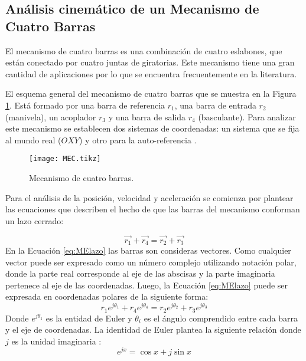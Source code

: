 \subsection{Análisis cinemático de un Mecanismo de Cuatro Barras}\label{sec:Análisis cinemático de un Mecanismo de Cuatro Barras}
El mecanismo de cuatro barras es una combinación de cuatro eslabones, que están conectado por cuatro juntas de giratorias. Este mecanismo tiene una gran cantidad de aplicaciones por lo que se encuentra frecuentemente en la literatura. 


El esquema general del mecanismo de cuatro barras que se muestra en la Figura \ref{fig:MEC}. Está formado por una barra de referencia $r_1$, una barra de entrada $r_2$ (manivela), un acoplador $r_3$ y una barra de salida $r_4$ (basculante). Para analizar este mecanismo se establecen dos sistemas de coordenadas: un sistema que se fija al mundo real ($OXY$) y otro para la auto-referencia \cite{herne1_two_swim_2016}.

\begin{figure}[htb]
    \centering
    \resizebox {\textwidth} {\height} {
     \texttt{[image: MEC.tikz]}
     }
    \caption{Mecanismo de cuatro barras.}
    \label{fig:MEC}
\end{figure}
Para el análisis de la posición, velocidad y aceleración se comienza por plantear las ecuaciones que describen el hecho de que las barras del mecanismo conforman un lazo cerrado:

\begin{equation}\label{eq:MElazo}
\vec{r_1}+\vec{r_4}=\vec{r_2}+\vec{r_3}
\end{equation}
 En la Ecuación \ref{eq:MElazo} las barras son consideras vectores. Como cualquier vector puede ser expresado como un número complejo utilizando notación polar, donde la parte real corresponde al eje de las abscisas y la parte imaginaria pertenece al eje de las coordenadas. Luego, la Ecuación \ref{eq:MElazo} puede ser expresada en coordenadas polares de la siguiente forma:
\begin{equation}\label{eq:MElazoPolar}
r_1e^{j\theta_1}+r_4e^{j\theta_4}=r_2e^{j\theta_2}+r_3e^{j\theta_3}
\end{equation}
Donde $e^{j\theta_1}$ es la entidad de Euler y $\theta_i$ es el ángulo comprendido entre cada barra y el eje de coordenadas. La identidad de Euler plantea la siguiente relación donde $j$ es la unidad imaginaria \cite{weisstein_euler_nodate}:
\begin{equation}\label{eq:Euler}
 e^{jx}=\cos{x}+j\sin{x} 
\end{equation}


